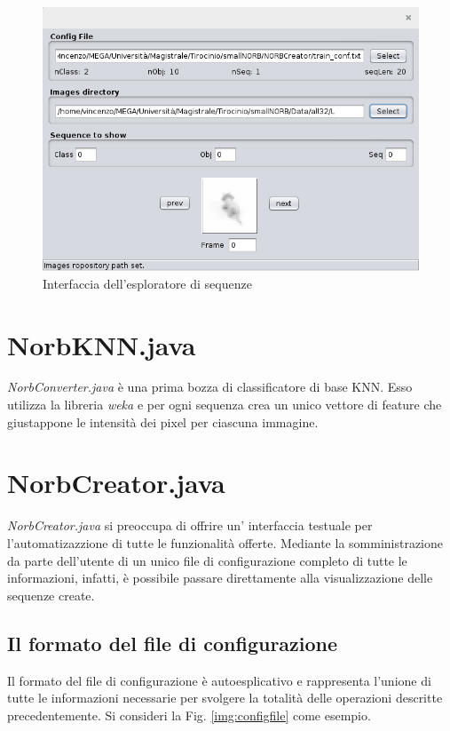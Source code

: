 \documentclass[paper=a4, fontsize=11pt]{scrartcl} %
\numberwithin{equation}{section} %
\numberwithin{figure}{section} %
\numberwithin{table}{section} %
\begin{document}
\begin{figure}[H]
  \centering
  	\label{img:seqexplorer}
    \includegraphics[width=\textwidth]{seqBrowser}
    \caption{Interfaccia dell'esploratore di sequenze}
\end{figure}

\section{NorbKNN.java}
\emph{NorbConverter.java} è una prima bozza di classificatore di base KNN. Esso utilizza la libreria \emph{weka} e per ogni sequenza crea un unico vettore di feature che giustappone le intensità dei pixel per ciascuna immagine.

\section{NorbCreator.java}
\emph{NorbCreator.java} si preoccupa di offrire un' interfaccia testuale per l'automatizazzione di tutte le funzionalità offerte.
Mediante la somministrazione da parte dell'utente di un unico file di configurazione completo di tutte le informazioni, infatti, è possibile passare direttamente alla visualizzazione delle sequenze create.

\subsection{Il formato del file di configurazione}
Il formato del file di configurazione è autoesplicativo e rappresenta l'unione di tutte le informazioni necessarie per svolgere la totalità delle operazioni descritte precedentemente.
Si consideri la Fig. \ref{img:configfile} come esempio.
\end{document}
